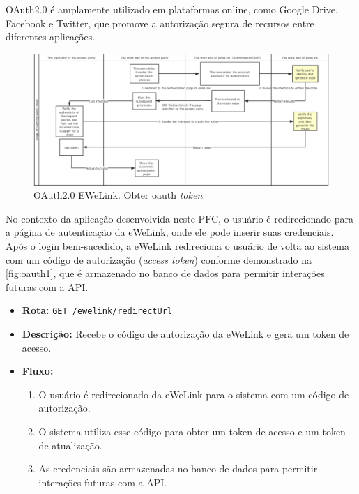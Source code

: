 OAuth2.0 é amplamente utilizado em plataformas online, como Google Drive, Facebook e Twitter, que promove a autorização segura de recursos entre diferentes aplicações.

\begin{figure}[htp]
	\caption{\label{fig:oauth1}OAuth2.0 EWeLink. Obter oauth \textit{token}}
	\begin{center}
	  \includegraphics[scale=0.45]{images/cap5/oauth_1.png}
	\end{center}
\end{figure}

No contexto da aplicação desenvolvida neste PFC, o usuário é redirecionado para a página de autenticação da eWeLink, onde ele pode inserir suas credenciais. Após o login bem-sucedido, a eWeLink redireciona o usuário de volta ao sistema com um código de autorização (\textit{access token}) conforme demonstrado na \autoref{fig:oauth1}, que é armazenado no banco de dados para permitir interações futuras com a API.

\begin{itemize}
    \item \textbf{Rota:} \texttt{GET /ewelink/redirectUrl}
    \item \textbf{Descrição:} Recebe o código de autorização da eWeLink e gera um token de acesso.
    \item \textbf{Fluxo:}
    \begin{enumerate}
        \item O usuário é redirecionado da eWeLink para o sistema com um código de autorização.
        \item O sistema utiliza esse código para obter um token de acesso e um token de atualização.
        \item As credenciais são armazenadas no banco de dados para permitir interações futuras com a API.
    \end{enumerate}
\end{itemize}

